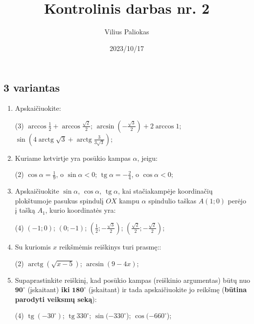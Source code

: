 \documentclass[a4paper]{article}
\title{Kontrolinis darbas nr. 2}
\author{Vilius Paliokas}
\date{2023/10/17}
\DeclareMathOperator{\tg}{tg}
\DeclareMathOperator{\arctg}{arctg}
\begin{document}
\thispagestyle{empty}
\subsection*{3 variantas}

\begin{enumerate}
      \item Apskaičiuokite:

            \begin{tasks}[item-format={\normalfont}, after-item-skip=4mm](3)
                  \task $\arccos{\frac{1}{2}} + \arccos{\frac{\sqrt{2}}{2}} $;
                  \task $\arcsin{(-\frac{\sqrt{3}}{2})} + 2\arccos{1} $;
                  \task $\sin({4\arctg{\sqrt{3}} +
                              \arctg{\frac{3}{3\sqrt{3}}}})  $;

            \end{tasks}

      \item Kuriame ketvirtje yra posūkio kampas $\alpha$, jeigu:
            \begin{tasks}[item-format={\normalfont}, after-item-skip=4mm](2)
                  \task $\cos \alpha = \frac{1}{9}$, o $\sin \alpha < 0$;
                  \task $\tg \alpha = -\frac{2}{4}$, o $\cos \alpha < 0$;
            \end{tasks}
      \item Apskaičiuokite $\sin \alpha$, $\cos \alpha$, $\tg \alpha$, kai
            stačiakampėje koordinačių plokštumoje pasukus spindulį $OX$ kampu
            $\alpha$ spindulio taškas $A(1; 0)$ perėjo į tašką $A_{1}$, kurio
            koordinatės
            yra:
            \begin{tasks}[item-format={\normalfont}, after-item-skip=4mm](4)
                  \task $(-1; 0)$;
                  \task $(0; -1)$;
                  \task $(\frac{1}{2}; -\frac{\sqrt{3}}{2})$;
                  \task $(\frac{\sqrt{2}}{2}; -\frac{\sqrt{2}}{2})$;
            \end{tasks}

      \item Su kuriomis $x$ reikšmėmis reiškinys turi prasmę::
            \begin{tasks}[item-format={\normalfont},
                        after-item-skip=4mm](2)
                  \task $\arctg(\sqrt{x-5})$;
                  \task $\arcsin(9-4x)$;
            \end{tasks}

      \item Supaprastinkite reiškinį, kad posūkio kampas (reiškinio argumentas)
            būtų nuo
            \textbf{$\boldsymbol{90^\circ}$} (įskaitant)
            \textbf{iki}	$\boldsymbol{180^\circ}$ (įskaitant) ir tada
            apskaičiuokite jo
            reikšmę
            (\textbf{būtina parodyti veiksmų seką}):
            \begin{tasks}[item-format={\normalfont},
                        after-item-skip=4mm](4)
                  \task $\tg (-30^\circ)$;
                  \task $\tg 330^\circ$;
                  \task $\sin (-330^\circ$);
                        \task $\cos (-660^\circ$);
            \end{tasks}


\end{enumerate}
\end{document}
